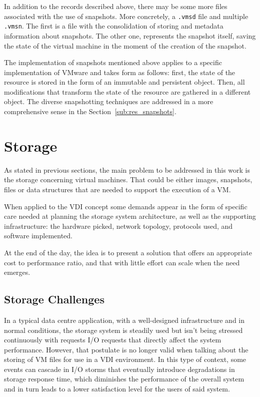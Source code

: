 In addition to the records described above, there may be some more files associated with the use of snapshots. More concretely, a \texttt{.vmsd} file and multiple \texttt{.vmsn}. The first is a file with the consolidation of storing and metadata information about snapshots. The other one, represents the snapshot itself, saving the state of the virtual machine in the moment of the creation of the snapshot.

The implementation of snapshots mentioned above applies to a specific implementation of VMware and takes form as follows: first, the state of the resource is stored in the form of an immutable and persistent object. Then, all modifications that transform the state of the resource are gathered in a different object. 
The diverse snapshotting techniques are addressed in a more comprehensive sense in the Section~\ref{sub:res_snapshots}.


\section{Storage} %
\label{sec:res_storage}

As stated in previous sections, the main problem to be addressed in this work is the storage concerning virtual machines. That could be either images, snapshots, files or data structures that are needed to support the execution of a VM. 

When applied to the VDI concept some demands appear in the form of specific care needed at planning the storage system architecture, as well as the supporting infrastructure: the hardware picked, network topology, protocols used, and software implemented.

At the end of the day, the idea is to present a solution that offers an appropriate cost to performance ratio, and that with little effort can scale when the need emerges.


\subsection{Storage Challenges}
\label{sub:res_storage_challenges}

In a typical data centre application, with a well-designed infrastructure and in normal conditions, the storage system is steadily used but isn't being stressed continuously with requests I/O requests that directly affect the system performance. However, that postulate is no longer valid when talking about the storing of VM files for use in a VDI environment. In this type of context, some events can cascade in I/O storms that eventually introduce degradations in storage response time, which diminishes the performance of the overall system and in turn leads to a lower satisfaction level for the users of said system.

